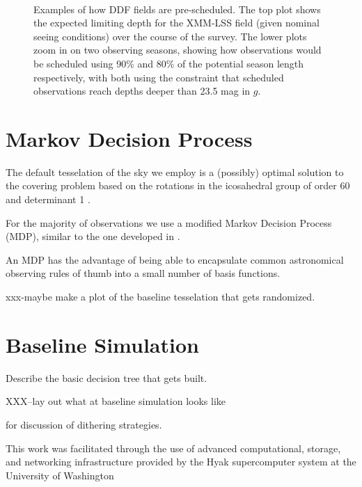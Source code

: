 \documentclass[]{aastex631}
\begin{document}
\begin{figure}
    \\
    \caption{Examples of how DDF fields are pre-scheduled. The top plot shows the expected limiting depth for the XMM-LSS field (given nominal seeing conditions) over the course of the survey. The lower plots zoom in on two observing seasons, showing how observations would be scheduled using 90\% and 80\% of the potential season length respectively, with both using the constraint that scheduled observations reach depths deeper than 23.5 mag in $g$.}
    \label{fig:ddf_examples}
\end{figure}

\section{Markov Decision Process}

The default tesselation of the sky we employ is a (possibly) optimal solution to the covering problem based on the rotations in the icosahedral group of order 60 and determinant 1 \citep{Hardin94}.

For the majority of observations we use a modified Markov Decision Process (MDP), similar to the one developed in \citet{Naghib2019}.

An MDP has the advantage of being able to encapsulate common astronomical observing rules of thumb into a small number of basis functions. 


xxx-maybe make a plot of the baseline tesselation that gets randomized. 

\section{Baseline Simulation}

Describe the basic decision tree that gets built. 


XXX--lay out what at baseline simulation looks like


\citet{Awan2016} for discussion of dithering strategies. 

          
{}


\begin{acknowledgments}
This work was facilitated through the use of advanced computational, storage, and networking infrastructure provided by the Hyak supercomputer system at the University of Washington
\end{acknowledgments}
\end{document}
